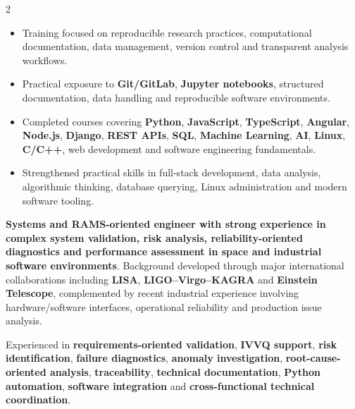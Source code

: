 \documentclass[8pt,a4paper,ragged2e,withhyper]{altacv}
\begin{document}
\begin{paracol}{2}


\divider


\begin{itemize}
\item Training focused on reproducible research practices, computational documentation, data management, version control and transparent analysis workflows.
\item Practical exposure to \textbf{Git/GitLab}, \textbf{Jupyter notebooks}, structured documentation, data handling and reproducible software environments.
\end{itemize}

\divider


\begin{itemize}
\item Completed courses covering \textbf{Python}, \textbf{JavaScript}, \textbf{TypeScript}, \textbf{Angular}, \textbf{Node.js}, \textbf{Django}, \textbf{REST APIs}, \textbf{SQL}, \textbf{Machine Learning}, \textbf{AI}, \textbf{Linux}, \textbf{C/C++}, web development and software engineering fundamentals.
\item Strengthened practical skills in full-stack development, data analysis, algorithmic thinking, database querying, Linux administration and modern software tooling.
\end{itemize}


\switchcolumn


\textbf{Systems and RAMS-oriented engineer with strong experience in complex system validation, risk analysis, reliability-oriented diagnostics and performance assessment in space and industrial software environments}. Background developed through major international collaborations including \textbf{LISA}, \textbf{LIGO--Virgo--KAGRA} and \textbf{Einstein Telescope}, complemented by recent industrial experience involving hardware/software interfaces, operational reliability and production issue analysis.

Experienced in \textbf{requirements-oriented validation}, \textbf{IVVQ support}, \textbf{risk identification}, \textbf{failure diagnostics}, \textbf{anomaly investigation}, \textbf{root-cause-oriented analysis}, \textbf{traceability}, \textbf{technical documentation}, \textbf{Python automation}, \textbf{software integration} and \textbf{cross-functional technical coordination}.


\end{paracol}
\end{document}
